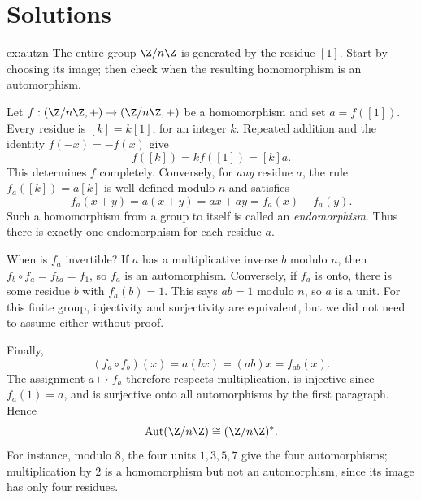 \section{Solutions}

\begin{solution}{ex:autzn}
\idea The entire group $\Z/n\Z$ is generated by the residue $[1]$. Start by choosing its image; then check when the resulting homomorphism is an automorphism.

\writeup Let $f:(\Z/n\Z,+)\to(\Z/n\Z,+)$ be a homomorphism and set $a=f([1])$. Every residue is $[k]=k[1]$, for an integer $k$. Repeated addition and the identity $f(-x)=-f(x)$ give
\[
f([k])=k f([1])=[k]a.
\]
This determines $f$ completely. Conversely, for \emph{any} residue $a$, the rule $f_a([k])=a[k]$ is well defined modulo $n$ and satisfies
\[
f_a(x+y)=a(x+y)=ax+ay=f_a(x)+f_a(y).
\]
Such a homomorphism from a group to itself is called an \emph{endomorphism}. Thus there is exactly one endomorphism for each residue $a$.

When is $f_a$ invertible? If $a$ has a multiplicative inverse $b$ modulo $n$, then $f_b\circ f_a=f_{ba}=f_1$, so $f_a$ is an automorphism. Conversely, if $f_a$ is onto, there is some residue $b$ with $f_a(b)=1$. This says $ab=1$ modulo $n$, so $a$ is a unit. For this finite group, injectivity and surjectivity are equivalent, but we did not need to assume either without proof.

Finally,
\[
(f_a\circ f_b)(x)=a(bx)=(ab)x=f_{ab}(x).
\]
The assignment $a\mapsto f_a$ therefore respects multiplication, is injective since $f_a(1)=a$, and is surjective onto all automorphisms by the first paragraph. Hence
\[
\operatorname{Aut}(\Z/n\Z)\cong(\Z/n\Z)^*.
\]
For instance, modulo $8$, the four units $1,3,5,7$ give the four automorphisms; multiplication by $2$ is a homomorphism but not an automorphism, since its image has only four residues.
\end{solution}

